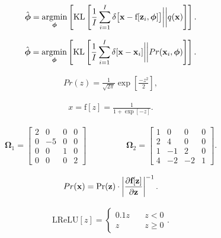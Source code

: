 \documentclass[letterpaper,twoside,openany, titlepage,oldfontcommands,titles,dvipsnames]{memoir}
\begin{document}
\begin{eqnarray}\label{eq:flow_reverse_KL}
 \hat{\boldsymbol\phi} = \mathop{\rm argmin}_{\boldsymbol\phi}\left[\mbox{KL}\left[\frac{1}{I}\sum_{i=1}^I \delta\bigl[\mathbf{x}-\mbox{f}[\mathbf{z}_{i},\boldsymbol\phi]\bigr]\biggl|\biggr|q(\mathbf{x})\right]\right].
 \end{eqnarray}

\begin{eqnarray}
 \hat{\boldsymbol\phi} = \mathop{\rm argmin}_{\boldsymbol\phi}\left[\mbox{KL}\left[\frac{1}{I}\sum_{i=1}^{I}\delta[\mathbf{x}-\mathbf{x}_{i}]\biggl|\biggr|Pr(\mathbf{x}_i,\boldsymbol\phi)\right]\right].
 \end{eqnarray}



\begin{eqnarray}\label{eq:prob_flow_transform2}
  Pr(z) = \frac{1}{\sqrt{2\pi}}\exp\left[\frac{-z^2}{2}\right],
 \end{eqnarray}

\begin{eqnarray}
 x = \mbox{f}[z] = \frac{1}{1+\exp[-z]}.
 \end{eqnarray}

\begin{eqnarray}
 \boldsymbol\Omega_{1} = \begin{bmatrix}2 & 0 & 0 & 0 \\ 0 & -5 & 0 & 0 \\ 0 & 0 & 1 & 0 \\ 0 & 0 & 0 & 2\end{bmatrix}\hspace{2cm}\boldsymbol\Omega_{2} = \begin{bmatrix}1 & 0 & 0 & 0 \\ 2 & 4 & 0 & 0 \\ 1 & -1 & 2 & 0 \\ 4 & -2 & -2 & 1 \end{bmatrix}.
 \end{eqnarray}

\begin{eqnarray}
  Pr(\mathbf{x}) = \mbox{Pr}(\mathbf{z}) \cdot \left| \frac{\partial \mbox{\bf f}[\mathbf{z}]}{\partial \mathbf{z}}\right|^{-1}.
 \end{eqnarray}

\begin{eqnarray}
 \mbox{LReLU}[z] = \begin{cases} 0.1z & \quad z <0 \\ z & \quad z\geq 0\end{cases}.
 \end{eqnarray}
\end{document}
